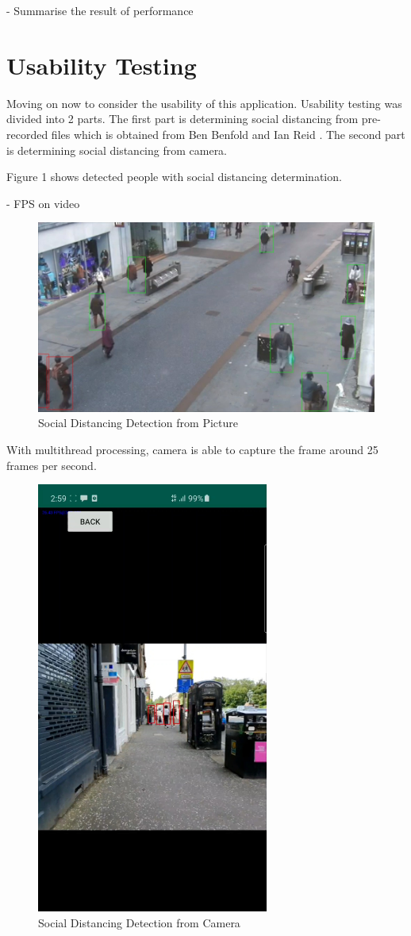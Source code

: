     - Summarise the result of performance

    \section{Usability Testing}
        Moving on now to consider the usability of this application.
        Usability testing was divided into 2 parts.
        The first part is determining social distancing from pre-recorded files which is obtained from Ben Benfold and Ian Reid \cite{benfold2009attention}.
        The second part is determining social distancing from camera.

        Figure 1 shows detected people with social distancing determination.

        - FPS on video
        \begin{figure}[!ht]
            \includegraphics[width=6in]{images/chapter5/application/picture-detection.jpg}
            \caption{Social Distancing Detection from Picture}
            \label{result:picture}
        \end{figure}

        With multithread processing, camera is able to capture the frame around 25 frames per second.

        \begin{figure}[!ht]
            \includegraphics[width=3in]{images/chapter5/application/camera-detection.jpg}
            \caption{Social Distancing Detection from Camera}
            \label{result:camera}
        \end{figure}